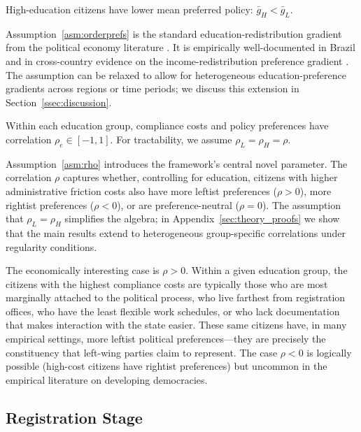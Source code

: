 \begin{assumption}
\label{asm:orderprefs}
High-education citizens have lower mean preferred policy: $\bar g_H < \bar g_L$.
\end{assumption}

Assumption~\ref{asm:orderprefs} is the standard education-redistribution gradient from the political economy literature \citep{meltzerRichard1981}. It is empirically well-documented in Brazil \citep{Hunter2010, Soares2011} and in cross-country evidence on the income-redistribution preference gradient \citep{Alesina2018}. The assumption can be relaxed to allow for heterogeneous education-preference gradients across regions or time periods; we discuss this extension in Section~\ref{ssec:discussion}.

\begin{assumption}
\label{asm:rho}
Within each education group, compliance costs and policy preferences have correlation $\rho_e \in [-1, 1]$. For tractability, we assume $\rho_L = \rho_H = \rho$.
\end{assumption}

Assumption~\ref{asm:rho} introduces the framework's central novel parameter. The correlation $\rho$ captures whether, controlling for education, citizens with higher administrative friction costs also have more leftist preferences ($\rho > 0$), more rightist preferences ($\rho < 0$), or are preference-neutral ($\rho = 0$). The assumption that $\rho_L = \rho_H$ simplifies the algebra; in Appendix~\ref{sec:theory_proofs} we show that the main results extend to heterogeneous group-specific correlations under regularity conditions.

The economically interesting case is $\rho > 0$. Within a given education group, the citizens with the highest compliance costs are typically those who are most marginally attached to the political process, who live farthest from registration offices, who have the least flexible work schedules, or who lack documentation that makes interaction with the state easier. These same citizens have, in many empirical settings, more leftist political preferences---they are precisely the constituency that left-wing parties claim to represent. The case $\rho < 0$ is logically possible (high-cost citizens have rightist preferences) but uncommon in the empirical literature on developing democracies.

\subsection{Registration Stage}
\label{ssec:registration}

